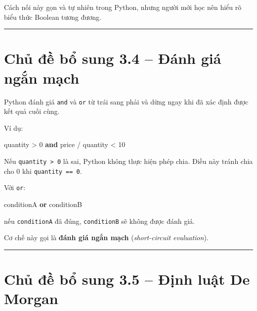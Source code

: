 \documentclass[
  11pt,
  a4paper,
]{article}
\newenvironment{Shaded}{}{}
\newcommand{\DecValTok}[1]{\textcolor[rgb]{0.25,0.63,0.44}{#1}}
\newcommand{\KeywordTok}[1]{\textcolor[rgb]{0.00,0.44,0.13}{\textbf{#1}}}
\newcommand{\NormalTok}[1]{#1}
\newcommand{\OperatorTok}[1]{\textcolor[rgb]{0.40,0.40,0.40}{#1}}
\begin{document}
Cách nối này gọn và tự nhiên trong Python, nhưng người mới học nên hiểu
rõ biểu thức Boolean tương đương.

\begin{center}\rule{0.5\linewidth}{0.5pt}\end{center}

\section{Chủ đề bổ sung 3.4 -- Đánh giá ngắn
mạch}\label{chux1ee7-ux111ux1ec1-bux1ed5-sung-3.4-ux111uxe1nh-giuxe1-ngux1eafn-mux1ea1ch}

Python đánh giá \texttt{and} và \texttt{or} từ trái sang phải và dừng
ngay khi đã xác định được kết quả cuối cùng.

Ví dụ:

\begin{Shaded}
\begin{Highlighting}[]
\NormalTok{quantity }\OperatorTok{\textgreater{}} \DecValTok{0} \KeywordTok{and}\NormalTok{ price }\OperatorTok{/}\NormalTok{ quantity }\OperatorTok{\textless{}} \DecValTok{10}
\end{Highlighting}
\end{Shaded}

Nếu \texttt{quantity\ \textgreater{}\ 0} là sai, Python không thực hiện
phép chia. Điều này tránh chia cho 0 khi \texttt{quantity\ ==\ 0}.

Với \texttt{or}:

\begin{Shaded}
\begin{Highlighting}[]
\NormalTok{conditionA }\KeywordTok{or}\NormalTok{ conditionB}
\end{Highlighting}
\end{Shaded}

nếu \texttt{conditionA} đã đúng, \texttt{conditionB} sẽ không được đánh
giá.

Cơ chế này gọi là \textbf{đánh giá ngắn mạch} (\emph{short-circuit
evaluation}).

\begin{center}\rule{0.5\linewidth}{0.5pt}\end{center}

\section{Chủ đề bổ sung 3.5 -- Định luật De
Morgan}\label{chux1ee7-ux111ux1ec1-bux1ed5-sung-3.5-ux111ux1ecbnh-luux1eadt-de-morgan}
\end{document}
